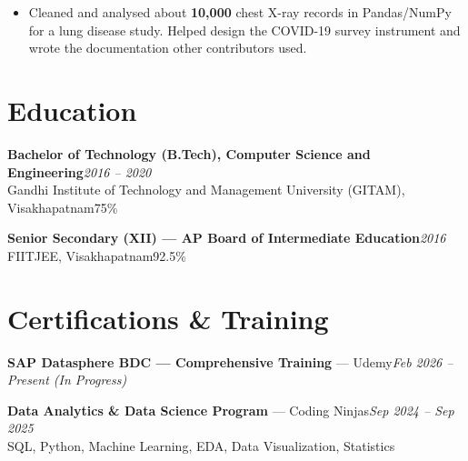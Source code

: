 \documentclass[10pt, letterpaper]{article}
\begin{document}
\begin{itemize}
  \item Cleaned and analysed about \textbf{10,000} chest X-ray records in Pandas/NumPy for a lung disease study. Helped design the COVID-19 survey instrument and wrote the documentation other contributors used.
\end{itemize}

\section{Education}

{\bfseries Bachelor of Technology (B.Tech), Computer Science and Engineering}\hfill{\small\color{muted}\textit{2016 -- 2020}}\\
{\small\color{muted}Gandhi Institute of Technology and Management University (GITAM), Visakhapatnam\hfill 75\%}

\vspace{2pt}
{\bfseries Senior Secondary (XII) --- AP Board of Intermediate Education}\hfill{\small\color{muted}\textit{2016}}\\
{\small\color{muted}FIITJEE, Visakhapatnam\hfill 92.5\%}

\section{Certifications \& Training}

{\bfseries SAP Datasphere BDC --- Comprehensive Training} --- Udemy\hfill{\small\color{muted}\textit{Feb 2026 -- Present \emph{(In Progress)}}}

\vspace{1pt}
{\bfseries Data Analytics \& Data Science Program} --- Coding Ninjas\hfill{\small\color{muted}\textit{Sep 2024 -- Sep 2025}}\\
{\small\color{muted}SQL, Python, Machine Learning, EDA, Data Visualization, Statistics}

\end{document}
